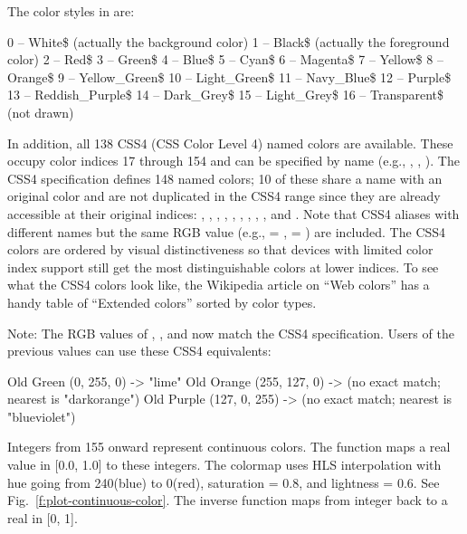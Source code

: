 The color styles in \quickplot are:
\begin{example}
    0 -- White\$   (actually the background color)
    1 -- Black\$   (actually the foreground color)
    2 -- Red\$
    3 -- Green\$
    4 -- Blue\$
    5 -- Cyan\$
    6 -- Magenta\$
    7 -- Yellow\$ 
    8 -- Orange\$
    9 -- Yellow_Green\$
   10 -- Light_Green\$
   11 -- Navy_Blue\$
   12 -- Purple\$
   13 -- Reddish_Purple\$
   14 -- Dark_Grey\$
   15 -- Light_Grey\$
   16 -- Transparent\$ (not drawn)
\end{example}

In addition, all 138 CSS4 (CSS Color Level 4) named colors are available. These occupy color indices
17 through 154 and can be specified by name (e.g., , ,
). The CSS4 specification defines 148 named colors; 10 of these share a name
with an original \quickplot color and are not duplicated in the CSS4 range since they are already
accessible at their original indices: , , , , ,
, , , , and . Note that CSS4 aliases with
different names but the same RGB value (e.g.,  = ,  = )
are included. The CSS4 colors are ordered by visual distinctiveness so that devices with limited
color index support still get the most distinguishable colors at lower indices. To see what 
the CSS4 colors look like, the Wikipedia article on  ``Web colors'' has a handy table of ``Extended colors''
sorted by color types.

Note: The RGB values of , , and  now match the CSS4 specification.
Users of the previous values can use these CSS4 equivalents:
\begin{example}
  Old Green  (0, 255, 0)   -> "lime"
  Old Orange (255, 127, 0) -> (no exact match; nearest is "darkorange")
  Old Purple (127, 0, 255) -> (no exact match; nearest is "blueviolet")
\end{example}

Integers from 155 onward represent continuous colors. The function  maps a
real value in [0.0, 1.0] to these integers. The colormap uses HLS interpolation with hue going from
240\Deg (blue) to 0\Deg (red), saturation = 0.8, and lightness = 0.6. See
Fig.~\ref{f:plot-continuous-color}. The inverse function  maps from
integer back to a real in [0, 1].


